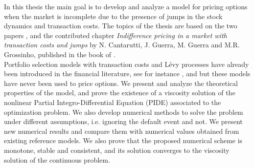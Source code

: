 In this thesis the main goal is to develop and analyze a model for pricing options when the market is incomplete due to the presence of jumps in the stock dynamics 
and transaction costs. 
The topics of the thesis are based on the two papers 
\cite{Canta2}, \cite{Canta} 
and the contributed chapter \emph{Indifference pricing in a market with transaction costs and jumps} by N. Cantarutti, J. Guerra, M. Guerra and 
M.R. Grossinho, published in the book of \cite{Matthias}.\\
Portfolio selection models with transaction costs and Lévy processes have already been introduced in the financial literature, see for instance \cite{OkSu01}, \cite{BKR01} and \cite{Kab16} 
but these models have never been used to price options.  
We present and analyze the theoretical properties of the model, and prove the existence of a viscosity solution 
of the nonlinear
Partial Integro-Differential Equation (PIDE) associated to the optimization problem. We also develop numerical methods to solve the problem under different assumptions, i.e. ignoring the 
default event and not.
We present new numerical results and compare them with numerical values obtained from existing reference models. We also prove that 
the proposed numerical scheme is monotone, stable and consistent, and its solution converges to the viscosity solution of the continuous problem.

